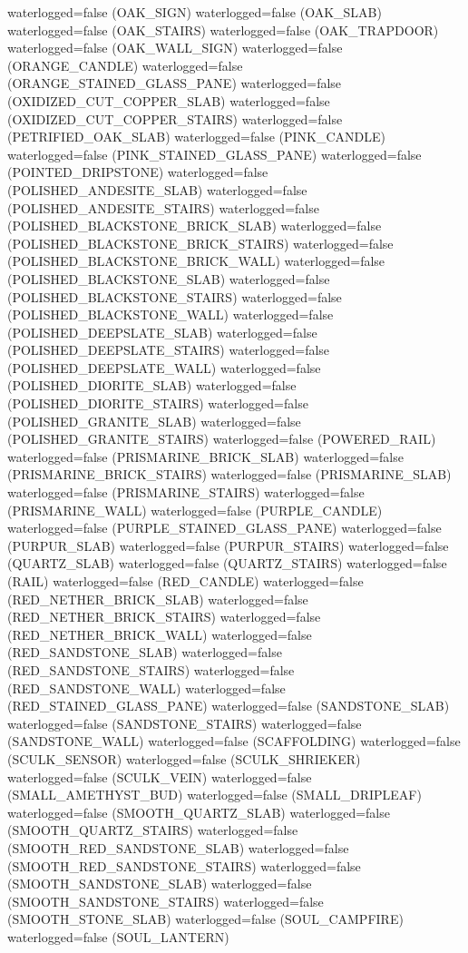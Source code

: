 \documentclass[11pt]{article}
\begin{document}
waterlogged=false (OAK_SIGN)
waterlogged=false (OAK_SLAB)
waterlogged=false (OAK_STAIRS)
waterlogged=false (OAK_TRAPDOOR)
waterlogged=false (OAK_WALL_SIGN)
waterlogged=false (ORANGE_CANDLE)
waterlogged=false (ORANGE_STAINED_GLASS_PANE)
waterlogged=false (OXIDIZED_CUT_COPPER_SLAB)
waterlogged=false (OXIDIZED_CUT_COPPER_STAIRS)
waterlogged=false (PETRIFIED_OAK_SLAB)
waterlogged=false (PINK_CANDLE)
waterlogged=false (PINK_STAINED_GLASS_PANE)
waterlogged=false (POINTED_DRIPSTONE)
waterlogged=false (POLISHED_ANDESITE_SLAB)
waterlogged=false (POLISHED_ANDESITE_STAIRS)
waterlogged=false (POLISHED_BLACKSTONE_BRICK_SLAB)
waterlogged=false (POLISHED_BLACKSTONE_BRICK_STAIRS)
waterlogged=false (POLISHED_BLACKSTONE_BRICK_WALL)
waterlogged=false (POLISHED_BLACKSTONE_SLAB)
waterlogged=false (POLISHED_BLACKSTONE_STAIRS)
waterlogged=false (POLISHED_BLACKSTONE_WALL)
waterlogged=false (POLISHED_DEEPSLATE_SLAB)
waterlogged=false (POLISHED_DEEPSLATE_STAIRS)
waterlogged=false (POLISHED_DEEPSLATE_WALL)
waterlogged=false (POLISHED_DIORITE_SLAB)
waterlogged=false (POLISHED_DIORITE_STAIRS)
waterlogged=false (POLISHED_GRANITE_SLAB)
waterlogged=false (POLISHED_GRANITE_STAIRS)
waterlogged=false (POWERED_RAIL)
waterlogged=false (PRISMARINE_BRICK_SLAB)
waterlogged=false (PRISMARINE_BRICK_STAIRS)
waterlogged=false (PRISMARINE_SLAB)
waterlogged=false (PRISMARINE_STAIRS)
waterlogged=false (PRISMARINE_WALL)
waterlogged=false (PURPLE_CANDLE)
waterlogged=false (PURPLE_STAINED_GLASS_PANE)
waterlogged=false (PURPUR_SLAB)
waterlogged=false (PURPUR_STAIRS)
waterlogged=false (QUARTZ_SLAB)
waterlogged=false (QUARTZ_STAIRS)
waterlogged=false (RAIL)
waterlogged=false (RED_CANDLE)
waterlogged=false (RED_NETHER_BRICK_SLAB)
waterlogged=false (RED_NETHER_BRICK_STAIRS)
waterlogged=false (RED_NETHER_BRICK_WALL)
waterlogged=false (RED_SANDSTONE_SLAB)
waterlogged=false (RED_SANDSTONE_STAIRS)
waterlogged=false (RED_SANDSTONE_WALL)
waterlogged=false (RED_STAINED_GLASS_PANE)
waterlogged=false (SANDSTONE_SLAB)
waterlogged=false (SANDSTONE_STAIRS)
waterlogged=false (SANDSTONE_WALL)
waterlogged=false (SCAFFOLDING)
waterlogged=false (SCULK_SENSOR)
waterlogged=false (SCULK_SHRIEKER)
waterlogged=false (SCULK_VEIN)
waterlogged=false (SMALL_AMETHYST_BUD)
waterlogged=false (SMALL_DRIPLEAF)
waterlogged=false (SMOOTH_QUARTZ_SLAB)
waterlogged=false (SMOOTH_QUARTZ_STAIRS)
waterlogged=false (SMOOTH_RED_SANDSTONE_SLAB)
waterlogged=false (SMOOTH_RED_SANDSTONE_STAIRS)
waterlogged=false (SMOOTH_SANDSTONE_SLAB)
waterlogged=false (SMOOTH_SANDSTONE_STAIRS)
waterlogged=false (SMOOTH_STONE_SLAB)
waterlogged=false (SOUL_CAMPFIRE)
waterlogged=false (SOUL_LANTERN)
\end{document}
